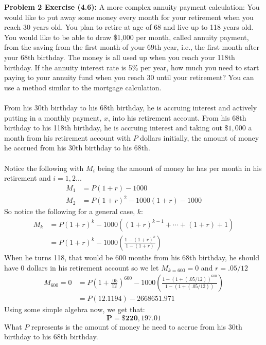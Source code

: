 \documentclass[11pt]{article}
\newenvironment{problem}[1]{\textbf{Problem #1: }}{\newpage}
\begin{document}
	\begin{problem}{2 Exercise (4.6)}
		A more complex annuity payment calculation: You would like to put away some
		money every month for your retirement when you reach 30 years old. You plan to retire at
		age of 68 and live up to 118 years old. You would like to be able to draw \$1,000 per month,
		called annuity payment, from the saving from the first month of your 69th year, i.e., the
		first month after your 68th birthday. The money is all used up when you reach your 118th
		birthday. If the annuity interest rate is 5\% per year, how much you need to start paying to
		your annuity fund when you reach 30 until your retirement? You can use a method similar
		to the mortgage calculation.
		\\ \\
		From his 30th birthday to his 68th birthday, he is accruing interest and actively putting in a monthly payment, $x$, into his retirement account.  From his 68th birthday to his 118th birthday, he is accruing interest and taking out $\$1,000$ a month from his retirement account with $P$ dollars initially, the amount of money he accrued from his 30th birthday to his 68th.
		\\ \\
		Notice the following with $M_i$ being the amount of money he has per month in his retirement and $i = 1,2...$  
		\begin{align*}
			M_1 &= P(1+r) - 1000 \\
			M_2 &= P(1+r)^2 - 1000(1+r) - 1000
		\end{align*}
		So notice the following for a general case, $k$:
		\begin{align*}
			M_k &= P(1+r)^k - 1000\left((1+r)^{k-1} + \cdots + (1+r) + 1 \right) \\
			&= P(1+r)^k - 1000\left( \frac{1 - (1 + r)^k}{1 - (1 + r)} \right) 
		\end{align*}
		When he turns 118, that would be 600 months from his 68th birthday, he should have 0 dollars in his retirement account so we let $M_{k = 600} = 0$ and $r = .05 / 12$
		\begin{align*}
			M_{600} = 0 &= P\left(1 + \frac{.05}{12}\right)^{600} - 1000\left( \frac{1 - (1 + (.05 / 12))^{600}}{1 - (1 + (.05 / 12))} \right) \\
			&= P\left(12.1194\right) - 2668651.971 
		\end{align*}
		Using some simple algebra now, we get that:
		\[\boldsymbol{P = \$220,197.01}\]
		What $P$ represents is the amount of money he need to accrue from his 30th birthday to his 68th birthday.


\end{problem}
\end{document}
